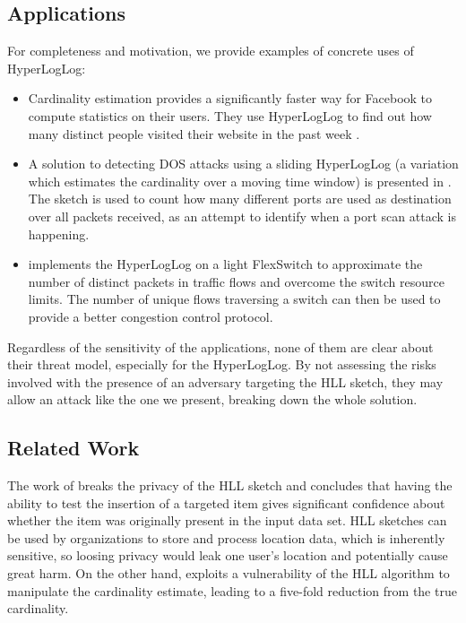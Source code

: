 \documentclass{IEEEtran}
\begin{document}
\subsection{Applications}
For completeness and motivation, we provide examples of concrete uses of HyperLogLog:
\begin{itemize}
    \item Cardinality estimation provides a significantly faster way for Facebook to compute statistics on their users. They use HyperLogLog to find out how many distinct people visited their website in the past week \cite{fbhll}.
    \item A solution to detecting DOS attacks using a sliding HyperLogLog \cite{slidinghll} (a variation which estimates the cardinality over a moving time window) is presented in \cite{portscanhll}. The sketch is used to count how many different ports are used as destination over all packets received, as an attempt to identify when a port scan attack is happening.
    \item \cite{flexswitch} implements the HyperLogLog on a light FlexSwitch to approximate the number of distinct packets in traffic flows and overcome the switch resource limits. The number of unique flows traversing a switch can then be used to provide a better congestion control protocol.
\end{itemize}

Regardless of the sensitivity of the applications, none of them are clear about their threat model, especially for the HyperLogLog. By not assessing the risks involved with the presence of an adversary targeting the HLL sketch, they may allow an attack like the one we present, breaking down the whole solution.

\subsection{Related Work}
The work of \cite{cardestprivacy} breaks the privacy of the HLL sketch and concludes that having the ability to test the insertion of a targeted item gives significant confidence about whether the item was originally present in the input data set. HLL sketches can be used by organizations to store and process location data, which is inherently sensitive, so loosing privacy would leak one user's location and potentially cause great harm. On the other hand, \cite{hllvuln} exploits a vulnerability of the HLL algorithm to manipulate the cardinality estimate, leading to a five-fold reduction from the true cardinality.
\end{document}
